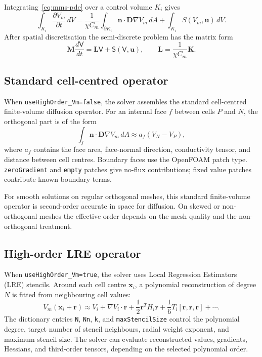 \documentclass[11pt,a4paper]{article}
\newcommand{\code}[1]{\texttt{\small #1}}
\newcommand{\Vm}{V_m}
\newcommand{\Dten}{\mathbf{D}}
\newcommand{\grad}{\nabla}
\newcommand{\Mmass}{\mathbf{M}}
\newcommand{\Kstif}{\mathbf{K}}
\newcommand{\Lop}{\mathbf{L}}
\begin{document}
Integrating~\eqref{eq:mms-pde} over a control volume $K_i$ gives
\begin{equation}
  \int_{K_i}\frac{\partial \Vm}{\partial t}\,dV
  =
  \frac{1}{\chi C_m}
  \int_{\partial K_i}\mathbf{n}\cdot\Dten\grad\Vm\,dA
  +
  \int_{K_i}S(\Vm,\mathbf{u})\,dV.
  \label{eq:fv-integral}
\end{equation}
After spatial discretisation the semi-discrete problem has the matrix form
\begin{equation}
  \Mmass \frac{d\mathsf{V}}{dt}
  =
  \Lop \mathsf{V}
  +
  \mathsf{S}(\mathsf{V},\mathbf{u}),
  \qquad
  \Lop = \frac{1}{\chi C_m}\Kstif.
  \label{eq:semidiscrete}
\end{equation}

\subsection{Standard cell-centred operator}

When \code{useHighOrder\_Vm=false}, the solver assembles the standard
cell-centred finite-volume diffusion operator. For an internal face $f$ between
cells $P$ and $N$, the orthogonal part is of the form
\begin{equation}
  \int_f \mathbf{n}\cdot\Dten\grad\Vm\,dA
  \approx
  a_f(V_N-V_P),
\end{equation}
where $a_f$ contains the face area, face-normal direction, conductivity tensor,
and distance between cell centres. Boundary faces use the OpenFOAM patch type.
\code{zeroGradient} and \code{empty} patches give no-flux contributions; fixed
value patches contribute known boundary terms.

For smooth solutions on regular orthogonal meshes, this standard finite-volume
operator is second-order accurate in space for diffusion. On skewed or
non-orthogonal meshes the effective order depends on the mesh quality and the
non-orthogonal treatment.

\subsection{High-order LRE operator}

When \code{useHighOrder\_Vm=true}, the solver uses Local
Regression Estimators (LRE) stencils. Around each cell centre $\mathbf{x}_i$, a polynomial
reconstruction of degree $N$ is fitted from neighbouring cell values:
\begin{equation}
  \Vm(\mathbf{x}_i+\mathbf{r})
  \approx
  V_i
  + \grad V_i\cdot\mathbf{r}
  + \frac{1}{2}\mathbf{r}^{T}H_i\mathbf{r}
  + \frac{1}{6}T_i[\mathbf{r},\mathbf{r},\mathbf{r}]
  + \cdots.
  \label{eq:lre-taylor}
\end{equation}
The dictionary entries \code{N}, \code{Nn}, \code{k}, and
\code{maxStencilSize} control the polynomial degree, target number of stencil
neighbours, radial weight exponent, and maximum stencil size. The solver can
evaluate reconstructed values, gradients, Hessians, and third-order tensors,
depending on the selected polynomial order.
\end{document}
